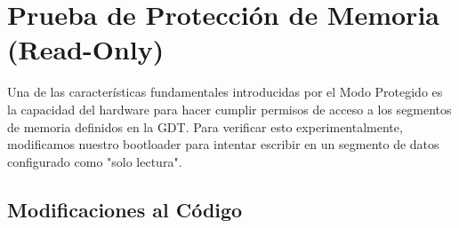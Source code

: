 
\section{Prueba de Protección de Memoria (Read-Only)}

Una de las características fundamentales introducidas por el Modo Protegido es la capacidad del hardware para hacer cumplir permisos de acceso a los segmentos de memoria definidos en la GDT. Para verificar esto experimentalmente, modificamos nuestro bootloader para intentar escribir en un segmento de datos configurado como "solo lectura".

\subsection{Modificaciones al Código}

